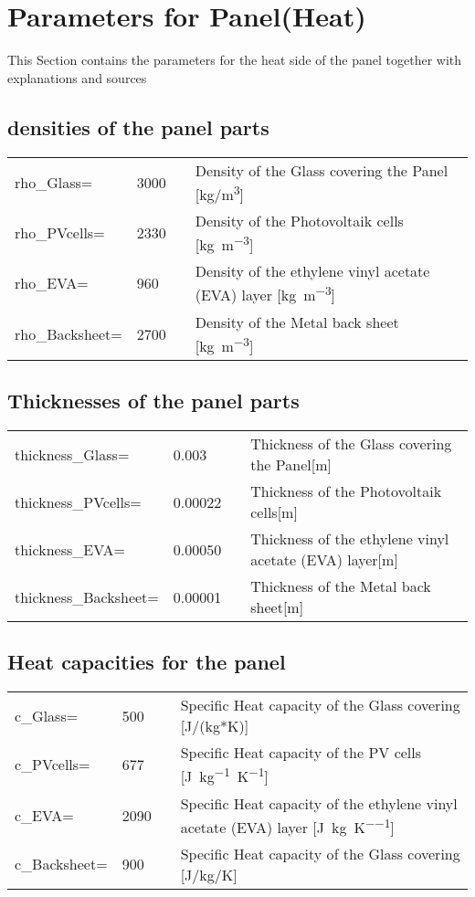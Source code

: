 

\section{Parameters for Panel(Heat)}

This Section contains the parameters for the heat side of the panel together with explanations and sources

\subsection{densities of the panel parts}
\begin{tabular}{ l l |c| l}
	rho_Glass=		&3000	&\cite{lim2017diurnal}	&Density of the Glass covering the Panel [kg/m\textsuperscript{3}]\\     	
	rho_PVcells=	&2330	&\cite{lim2017diurnal}	&Density of the Photovoltaik cells [\si{kg.m^{-3}}] \\     
	rho_EVA=		&960	&\cite{lim2017diurnal}	&Density of the ethylene vinyl acetate (EVA) layer [\si{\kilogram\per\meter^{3}}]\\
	rho_Backsheet=	&2700	&\cite{lim2017diurnal}	&Density of the Metal back sheet [\si[per-mode=fraction]{\kilogram\per\meter^{3}}]\\ 
\end{tabular}

\subsection{Thicknesses of the panel parts}
\begin{tabular}{ l l |c| l}
	thickness_Glass=	&0.003	&\cite{lim2017diurnal}&Thickness of the Glass covering the Panel[m]\\  	
	thickness_PVcells=	&0.00022&\cite{lim2017diurnal}&Thickness of the Photovoltaik cells[\si{m}]\\	
	thickness_EVA=		&0.00050&\cite{lim2017diurnal}&Thickness of the ethylene vinyl acetate (EVA) layer[\si{\meter}]\\
	thickness_Backsheet=&0.00001&\cite{lim2017diurnal}&Thickness of the Metal back sheet[m]\\ 	
\end{tabular}	

\subsection{Heat capacities for the panel}
\begin{tabular}{ l l |c| l}
	c_Glass=	&500	&\cite{lim2017diurnal}&Specific Heat capacity of the Glass covering [J/(kg*K)]\\
	c_PVcells=	&677	&\cite{lim2017diurnal}&Specific Heat capacity of the PV cells [\si{J.kg^{-1}.K^{-1}}]\\
	c_EVA=		&2090 	&\cite{lim2017diurnal}&Specific Heat capacity of the ethylene vinyl acetate (EVA) layer [\si{\joule\per\kilogram\per\kelvin}]\\
	c_Backsheet=&900	&\cite{lim2017diurnal}&Specific Heat capacity of the Glass covering  [\si[per-mode=symbol]{\joule\per\kilogram\per\kelvin}]\\	
\end{tabular}


